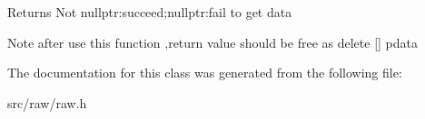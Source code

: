 \begin{DoxyReturn}{Returns}
Not nullptr\-:succeed;nullptr\-:fail to get data 
\end{DoxyReturn}
\begin{DoxyNote}{Note}
after use this function ,return value should be free as {\ttfamily delete \mbox{[}\mbox{]} pdata} 
\end{DoxyNote}


The documentation for this class was generated from the following file\-:\begin{DoxyCompactItemize}
\item 
src/raw/raw.\-h\end{DoxyCompactItemize}
